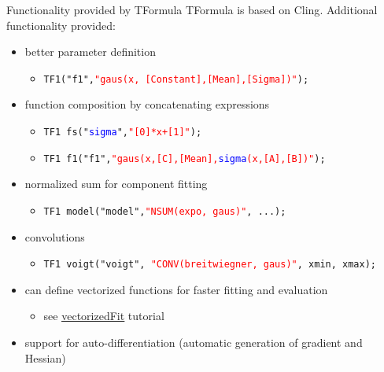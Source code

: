\documentclass[aspectratio=169]{beamer}
\newcommand{\myhref}[2]{{\color{blue}\href{#1}{\underline{#2}}}}
\begin{document}
\begin{frame}[fragile]{Functionality provided by TFormula}
    \textcolor{myblue}{TFormula is based on Cling}. Additional functionality provided:
\begin{itemize}
    \item{better parameter deﬁnition}
    \begin{itemize}
        \item \texttt{TF1("f1",\textcolor{red}{"gaus(x, [Constant],[Mean],[Sigma])"});}
    \end{itemize}
    \item{function composition by concatenating expressions}
    \begin{itemize}
        \item \texttt{TF1 fs("\textcolor{blue}{sigma}",\textcolor{red}{"[0]*x+[1]"});}
        \item \texttt{TF1 f1("f1",\textcolor{red}{"gaus(x,[C],[Mean],\textcolor{blue}{sigma}(x,[A],[B])"});}
    \end{itemize}
    \item{normalized sum for component ﬁtting}
    \begin{itemize}
        \item \texttt{TF1 model("model",\textcolor{red}{"NSUM(expo, gaus)"}, ...);}
    \end{itemize}
    \item{convolutions}
    \begin{itemize}
        \item \texttt{TF1 voigt("voigt", \textcolor{red}{"CONV(breitwiegner, gaus)"}, xmin, xmax);}
    \end{itemize}
    \item{can deﬁne vectorized functions for faster ﬁtting and evaluation}
    \begin{itemize}
        \item see \myhref{https://root.cern.ch/doc/master/vectorizedFit_8C.html}{vectorizedFit} tutorial
    \end{itemize}
    \item{support for auto-diﬀerentiation (automatic generation of gradient and
Hessian)}
\end{itemize}
\end{frame}
\end{document}
